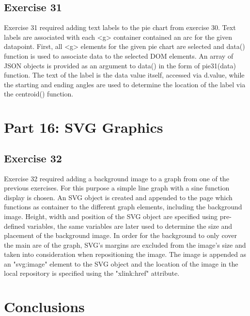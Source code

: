 \documentclass[11pt]{article}   	%
\begin{document}
\subsection{ Exercise 31}
Exercise 31 required adding text labels to the pie chart from exercise 30. Text labels are associated with each <g> container contained an arc for the given datapoint. First, all <g> elements for the given pie chart are selected and data() function is used to associate data to the selected DOM elements. An array of JSON objects is provided as an argument to data() in the form of pie31(data) function. The text of the label is the data value itself, accessed via d.value, while the starting and ending angles are used to determine the location of the label via the centroid() function. 

\section{Part 16: SVG Graphics}
\subsection{ Exercise 32}

Exercise 32 required adding a background image to a graph from one of the previous exercises. For this purpose a simple line graph with a sine function display is chosen. An SVG object is created and appended to the page which functions as container to the different graph elements, including the background image. Height, width and position of the SVG object are specified using pre-defined variables, the same variables are later used to determine the size and placement of the background image. In order for the background to only cover the main are of the graph, SVG's margins are excluded from the image's size and taken into consideration when repositioning the image. The image is appended as an "svg:image" element to the SVG object and the location of the image in the local repository is specified using the "xlink:href" attribute.     

\section{Conclusions}
\end{document}
